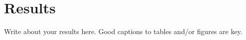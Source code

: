\section{Results}
\label{sec:results}
Write about your results here. Good captions to tables and/or figures are key.


